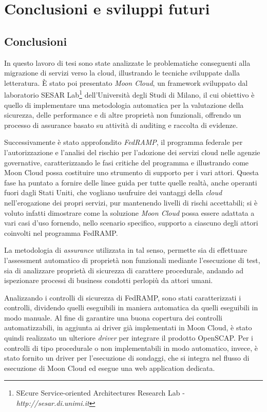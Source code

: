 \documentclass[../main.tex]{subfiles}
\begin{document}
\chapter{Conclusioni e sviluppi futuri}
\section {Conclusioni}
In questo lavoro di tesi sono state analizzate le problematiche conseguenti alla migrazione di servizi verso la cloud, illustrando le tecniche sviluppate dalla letteratura.
È stato poi presentato \textit{Moon Cloud}, un framework sviluppato dal laboratorio SESAR Lab\footnote{SEcure Service-oriented Architectures Research Lab - \textit{http://sesar.di.unimi.it}} dell'Università degli Studi di Milano, il cui obiettivo è quello di implementare una metodologia automatica per la valutazione della sicurezza, delle performance e di altre proprietà non funzionali, offrendo un processo di assurance basato su attività di auditing e raccolta di evidenze.

Successivamente è stato approfondito \textit{FedRAMP}, il programma federale per l'autorizzazione e l'analisi del rischio per l'adozione dei servizi cloud nelle agenzie governative, caratterizzando le fasi critiche del programma e illustrando come Moon Cloud possa costituire uno strumento di supporto per i vari attori.
Questa fase ha puntato a fornire delle linee guida per tutte quelle realtà, anche operanti fuori dagli Stati Uniti, che vogliano usufruire dei vantaggi della \textit{cloud} nell'erogazione dei propri servizi, pur mantenendo livelli di rischi accettabili; si è voluto infatti dimostrare come la soluzione \textit{Moon Cloud} possa essere adattata a vari casi d'uso fornendo, nello scenario specifico, supporto a ciascuno degli attori coinvolti nel programma FedRAMP.

La metodologia di \textit{assurance} utilizzata in tal senso, permette sia di effettuare l'assessment automatico di proprietà non funzionali mediante l'esecuzione di test, sia di analizzare proprietà di sicurezza di carattere procedurale, andando ad ispezionare processi di business condotti perlopiù da attori umani.

Analizzando i controlli di sicurezza di FedRAMP, sono stati caratterizzati i controlli, dividendo quelli eseguibili in maniera automatica da quelli eseguibili in modo manuale.
Al fine di garantire una buona copertura dei controlli automatizzabili, in aggiunta ai driver già implementati in Moon Cloud, è stato quindi realizzato un ulteriore \textit{driver} per integrare il prodotto OpenSCAP.
Per i controlli di tipo procedurale o non implementabili in modo automatico, invece, è stato fornito un driver per l'esecuzione di sondaggi, che si integra nel flusso di esecuzione di Moon Cloud ed esegue una web application dedicata.
\end{document}

